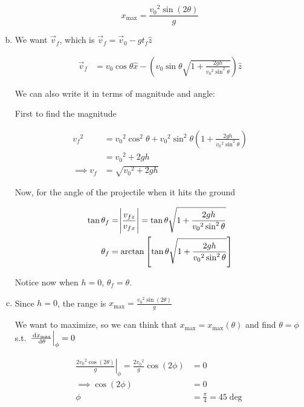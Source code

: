 \begin{sol}
\begin{enumerate}[a)]
		\begin{equation}
			x_\mathrm{max} = \frac{{v_0}^2 \sin(2\theta)}{g}
		\end{equation}

		\item We want $\vec v_f$, which is $\vec v_f = \vec v_0 - gt_f \hat z$
		
		\begin{align}
			\vec v_f &= v_0\cos\theta\hat x - \left(v_0\sin\theta \sqrt{1 + \frac{2gh}{{v_0}^2\sin^2\theta}}\right) \hat z
		\end{align}

		We can also write it in terms of magnitude and angle:

		First to find the magnitude

		\begin{align}
			{v_f}^2 &= {v_0}^2\cos^2\theta + {v_0}^2\sin^2\theta \left(1 + \frac{2gh}{{v_0}^2\sin^2\theta}\right)\\
			&= {v_0}^2 + 2gh\\
			\implies v_f &= \sqrt{{v_0}^2 + 2gh}
		\end{align}

		Now, for the angle of the projectile when it hits the ground

		\begin{align}
			\tan\theta_f &= \abs{\frac{v_{fz}}{v_{fx}}} = \tan\theta\sqrt{1 + \frac{2gh}{{v_0}^2\sin^2\theta}}\\
			\theta_f &= \arctan\left[\tan\theta \sqrt{1 + \frac{2gh}{{v_0}^2\sin^2\theta}}\right]
		\end{align}

		\begin{remark}
			Notice now when $h = 0$, $\theta_f = \theta$.
		\end{remark}

		\item Since $h = 0$, the range is $x_\mathrm{max} = \frac{{v_0}^2\sin(2\theta)}{g}$
		
		We want to maximize, so we can think that $x_\mathrm{max} = x_\mathrm{max}(\theta)$ and find $\theta = \phi$ s.t. $\left.\frac{\D x_\mathrm{max}}{\D \theta} \right|_\phi = 0$

		\begin{align}
			\left.\frac{2{v_0}^2 \cos(2\theta)}{g}\right|_\phi = \frac{2{v_0}^2}{g}\cos(2\phi) &= 0\\
			\implies \cos(2\phi) &= 0\\
			\phi &= \frac{\pi}{4} = 45\deg
		\end{align}
	\end{enumerate}
\end{sol}